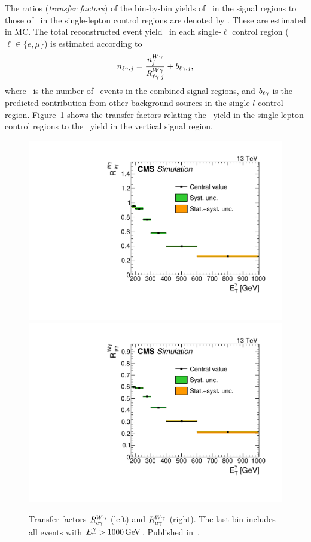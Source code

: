 The ratios (\textit{transfer factors}) of the bin-by-bin yields of \wlng\ in the signal regions to those
of \wlng\ in the single-lepton control regions are denoted by \RWl[,j]. These are estimated in MC.
The total reconstructed event yield \nl\ in each single-$\ell$ control region ($\ell \in \{e,\mu\}$) is estimated according to
\begin{equation}
  \nl[,j] = \frac{\nWg[j]}{\RWl[,j]} + b_{\ell\Pgamma,j},
\end{equation}
where \nWg\ is the number of \wlng\ events in the combined signal regions, and
$b_{\ell\Pgamma}$ is the predicted contribution from other background sources in the single-$l$ control region.
Figure~\ref{fig:tf_w} shows the transfer factors relating the \wlng\ yield in the single-lepton control regions to the \wlng\ yield in the
vertical signal region.

\begin{figure}[htbp]
  \begin{center}
    \includegraphics[width=0.48\linewidth]{Figures/exo16053/Figure_003-a}
    \includegraphics[width=0.48\linewidth]{Figures/exo16053/Figure_003-b}
    \caption{
          Transfer factors $R^{\PW\Pgamma}_{\Pe\Pgamma}$ (left) and $R^{\PW\Pgamma}_{\Pmu\Pgamma}$ (right). The last bin includes all events with $\ETgamma > 1000\unit{GeV}$.
          Published in~\cite{ref:JHEP02(2019)074}.
    }
    \label{fig:tf_w}
  \end{center}
\end{figure}

